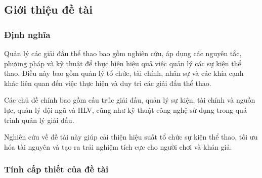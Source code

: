 \subsection{Giới thiệu đề tài}
\setcounter{figure}{0}

\subsubsection{Định nghĩa   }
Quản lý các giải đấu thể thao bao gồm nghiên cứu, áp dụng các nguyên tắc,
phương pháp và kỹ thuật để thực hiện hiệu quả việc quản lý các sự kiện thể thao.
Điều này bao gồm quản lý tổ chức, tài chính, nhân sự và các khía cạnh khác
liên quan đến việc thực hiện và duy trì các giải đấu thể thao.
\par
Các chủ đề chính bao gồm cấu trúc giải đấu, quản lý sự kiện, tài chính và nguồn lực,
quản lý đội ngũ và HLV, cũng như kỹ thuật công nghệ sử dụng trong quá trình quản lý
giải đấu.
\par
Nghiên cứu về đề tài này giúp cải thiện hiệu suất tổ chức sự kiện thể thao,
tối ưu hóa tài nguyên và tạo ra trải nghiệm tích cực cho người chơi và khán giả.


\subsubsection{Tính cấp thiết của đề tài }

